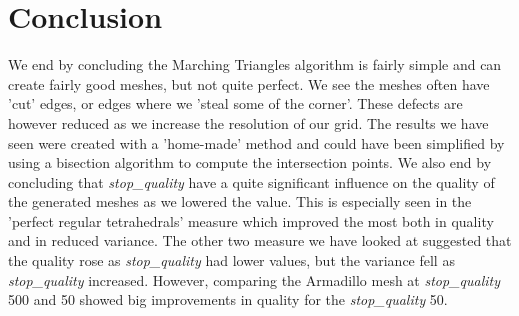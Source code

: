 \section{Conclusion}
We end by concluding the Marching Triangles algorithm is fairly simple and can create fairly good meshes, but not quite perfect. We see the meshes often have 'cut' edges, or edges where we 'steal some of the corner'. These defects are however reduced as we increase the resolution of our grid. The results we have seen were created with a 'home-made' method and could have been simplified by using a bisection algorithm to compute the intersection points. We also end by concluding that \textit{stop\_quality} have a quite significant influence on the quality of the generated meshes as we lowered the value. This is especially seen in the 'perfect regular tetrahedrals' measure which improved the most both in quality and in reduced variance. The other two measure we have looked at suggested that the quality rose as \textit{stop\_quality} had lower values, but the variance fell as \textit{stop\_quality} increased. However, comparing the Armadillo mesh at \textit{stop\_quality} 500 and 50 showed big improvements in quality for the \textit{stop\_quality} 50.